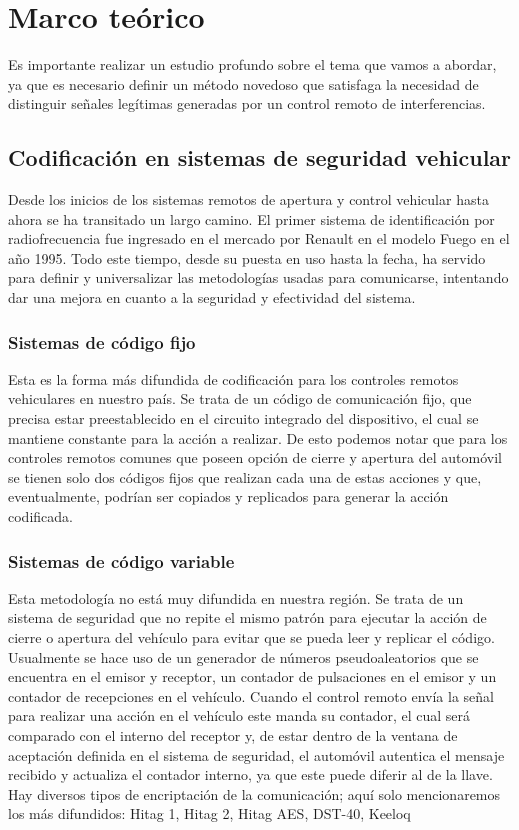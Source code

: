 \section{Marco teórico}


Es importante realizar un estudio profundo sobre el tema que vamos a abordar, ya que es necesario definir un método novedoso que satisfaga
la necesidad de distinguir señales legítimas generadas por un control remoto de interferencias.

\subsection{Codificación en sistemas de seguridad vehicular}

Desde los inicios de los sistemas remotos de apertura y control vehicular hasta ahora se ha transitado un largo camino. 
El primer sistema de identificación por radiofrecuencia fue ingresado en el mercado por Renault en el modelo Fuego en el año 1995.
Todo este tiempo, desde su puesta en uso hasta la fecha, ha servido para definir y universalizar las metodologías usadas para comunicarse,
intentando dar una mejora en cuanto a la seguridad y efectividad del sistema.\par

\subsubsection{Sistemas de código fijo}

Esta es la forma más difundida de codificación para los controles remotos vehiculares en nuestro país. Se trata de un código de comunicación
fijo, que precisa estar preestablecido en el circuito integrado del dispositivo, el cual se mantiene constante para la acción a realizar.
De esto podemos notar que para los controles remotos comunes que poseen opción de cierre y apertura del automóvil se tienen solo dos códigos
fijos que realizan cada una de estas acciones y que, eventualmente, podrían ser copiados y replicados para generar la acción codificada. 

\subsubsection{Sistemas de código variable}

Esta metodología no está muy difundida en nuestra región. Se trata de un sistema de seguridad que no repite el mismo patrón para ejecutar la 
acción de cierre o apertura del vehículo para evitar que se pueda leer y replicar el código. Usualmente se hace uso de un generador de números 
pseudoaleatorios que se encuentra en el emisor y receptor, un contador de pulsaciones en el emisor y un contador de recepciones en el vehículo.
Cuando el control remoto envía la señal para realizar una acción en el vehículo este manda su contador, el cual será comparado con el 
interno del receptor y, de estar dentro de la ventana de aceptación definida en el sistema de seguridad, el automóvil autentica el mensaje 
recibido y actualiza el contador interno, ya que este puede diferir al de la llave.
Hay diversos tipos de encriptación de la comunicación; aquí solo mencionaremos los más difundidos: Hitag 1, Hitag 2, Hitag AES, DST-40, Keeloq

